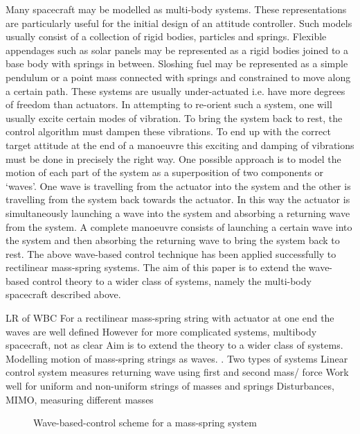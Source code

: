 \documentclass{mbd_fullpaper}
\begin{document}
Many spacecraft may be modelled as multi-body systems.
These representations are particularly useful for the initial design of an attitude controller.
Such models usually consist of a collection of rigid bodies, particles and springs.
Flexible appendages such as solar panels may be represented as a rigid bodies joined to a base body with springs in between.
Sloshing fuel may be represented as a simple pendulum or a point mass connected with springs and constrained to move along a certain path.
These systems are usually under-actuated i.e. have more degrees of freedom than actuators.
In attempting to re-orient such a system, one will usually excite certain modes of vibration.
To bring the system back to rest, the control algorithm must dampen these vibrations.
To end up with the correct target attitude at the end of a manoeuvre this exciting and damping of vibrations must be done in precisely the right way.
One possible approach is to model the motion of each part of the system as a superposition of two components or `waves'.
One wave is travelling from the actuator into the system and the other is travelling from the system back towards the actuator.
In this way the actuator is simultaneously launching a wave into the system and absorbing a returning wave from the system.
A complete manoeuvre consists of launching a certain wave into the system and then absorbing the returning wave to bring the system back to rest.
The above wave-based control technique has been applied successfully to rectilinear mass-spring systems.
The aim of this paper is to extend the wave-based control theory to a wider class of systems, namely the multi-body spacecraft described above. 

LR of WBC
For a rectilinear mass-spring string with actuator at one end the waves are well defined
However for more complicated systems, multibody spacecraft, not as clear
Aim is to extend the theory to a wider class of systems. 
Modelling motion of mass-spring strings as waves.
\cite{OConnor2011, Connor2005}. 
Two types of systems
Linear control system measures returning wave using first and second mass/ force
Work well for uniform and non-uniform strings of masses and springs
Disturbances, MIMO, measuring different masses
\begin{figure}[h]
  \begin{center}
    \caption{Wave-based-control scheme for a mass-spring system \label{fig:wave-based-control}}
  \end{center}
\end{figure}
\end{document}
